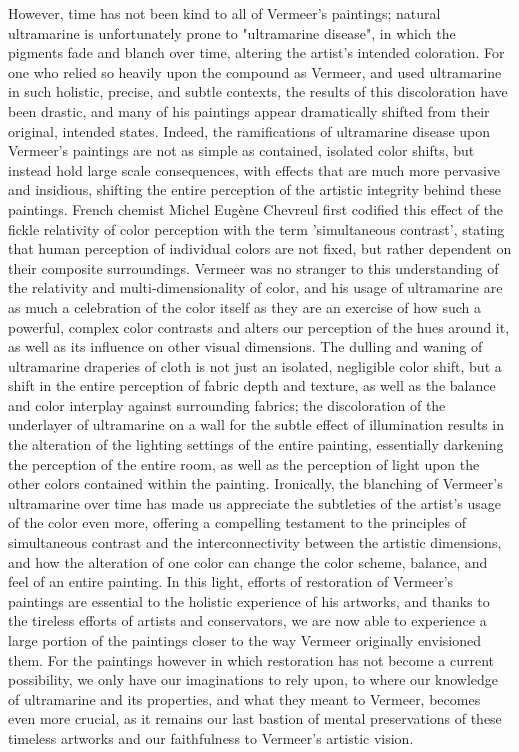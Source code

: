 However, time has not been kind to all of Vermeer's paintings; natural
ultramarine is unfortunately prone to "ultramarine disease", in which
the pigments fade and blanch over time, altering the artist's intended
coloration. For one who relied so heavily upon the compound as Vermeer,
and used ultramarine in such holistic, precise, and subtle contexts, the
results of this discoloration have been drastic, and many of his
paintings appear dramatically shifted from their original, intended
states. Indeed, the ramifications of ultramarine disease upon Vermeer's
paintings are not as simple as contained, isolated color shifts, but
instead hold large scale consequences, with effects that are much more
pervasive and insidious, shifting the entire perception of the artistic
integrity behind these paintings. French chemist Michel Eugène Chevreul
first codified this effect of the fickle relativity of color perception
with the term 'simultaneous contrast', stating that human perception of
individual colors are not fixed, but rather dependent on their composite
surroundings. Vermeer was no stranger to this understanding of the
relativity and multi-dimensionality of color, and his usage of
ultramarine are as much a celebration of the color itself as they are an
exercise of how such a powerful, complex color contrasts and alters our
perception of the hues around it, as well as its influence on other
visual dimensions. The dulling and waning of ultramarine draperies of
cloth is not just an isolated, negligible color shift, but a shift in
the entire perception of fabric depth and texture, as well as the
balance and color interplay against surrounding fabrics; the
discoloration of the underlayer of ultramarine on a wall for the subtle
effect of illumination results in the alteration of the lighting
settings of the entire painting, essentially darkening the perception of
the entire room, as well as the perception of light upon the other
colors contained within the painting. Ironically, the blanching of
Vermeer's ultramarine over time has made us appreciate the subtleties of
the artist's usage of the color even more, offering a compelling
testament to the principles of simultaneous contrast and the
interconnectivity between the artistic dimensions, and how the
alteration of one color can change the color scheme, balance, and feel
of an entire painting. In this light, efforts of restoration of
Vermeer's paintings are essential to the holistic experience of his
artworks, and thanks to the tireless efforts of artists and
conservators, we are now able to experience a large portion of the
paintings closer to the way Vermeer originally envisioned them. For the
paintings however in which restoration has not become a current
possibility, we only have our imaginations to rely upon, to where our
knowledge of ultramarine and its properties, and what they meant to
Vermeer, becomes even more crucial, as it remains our last bastion of
mental preservations of these timeless artworks and our faithfulness to
Vermeer's artistic vision.

